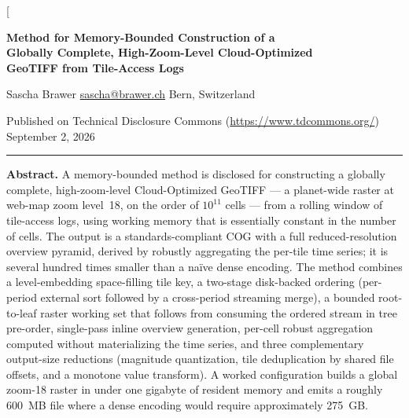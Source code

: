 \documentclass[10pt,twocolumn]{article}
\newcommand{\pubdate}{September 2, 2026} %
\begin{document}
\raggedbottom %

\twocolumn[{%
  \begin{center}
    {\LARGE\bfseries Method for Memory-Bounded Construction of a\\[3pt]
     Globally Complete, High-Zoom-Level Cloud-Optimized\\[3pt]
     GeoTIFF from Tile-Access Logs\par}
    \vspace{1em}
    {\large Sascha Brawer\,\textperiodcentered\,\href{mailto:sascha@brawer.ch}{sascha@brawer.ch}\,\textperiodcentered\,Bern, Switzerland\par}
    \vspace{0.35em}
    {\small Published on Technical Disclosure Commons
     (\url{https://www.tdcommons.org/})\,\textperiodcentered\,\pubdate\par}
  \end{center}
  \vspace{0.9em}
  \hrule
  \vspace{0.9em}
  \begingroup\small
  \noindent\textbf{Abstract.}
  A memory-bounded method is disclosed for constructing a globally complete,
  high-zoom-level Cloud-Optimized GeoTIFF --- a planet-wide raster at web-map
  zoom level~18, on the order of $10^{11}$ cells --- from a rolling window of
  tile-access logs, using working memory that is essentially constant in the
  number of cells. The output is a standards-compliant COG with a full
  reduced-resolution overview pyramid, derived by robustly aggregating the
  per-tile time series; it is several hundred times smaller than a na\"ive
  dense encoding. The method combines a level-embedding space-filling tile key,
  a two-stage disk-backed ordering (per-period external sort followed by a
  cross-period streaming merge), a bounded root-to-leaf raster working set that
  follows from consuming the ordered stream in tree pre-order, single-pass
  inline overview generation, per-cell robust aggregation computed without
  materializing the time series, and three complementary output-size reductions
  (magnitude quantization, tile deduplication by shared file offsets, and a
  monotone value transform). A worked configuration builds a global zoom-18
  raster in under one gigabyte of resident memory and emits a roughly 600~MB
  file where a dense encoding would require approximately 275~GB.\par
}
\end{document}
